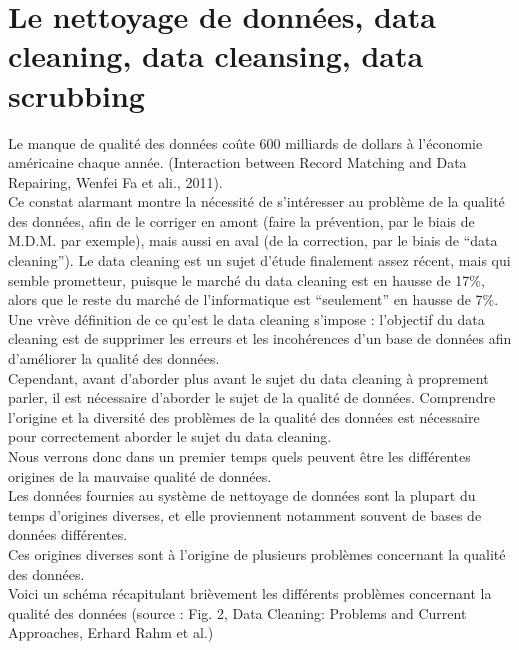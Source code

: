 \section{Le nettoyage de données, data cleaning, data cleansing, data scrubbing}

Le manque de qualité des données coûte 600 milliards de dollars à l’économie américaine chaque année. (Interaction between Record Matching and Data Repairing, Wenfei Fa et ali., 2011).\\
Ce constat alarmant montre la nécessité de s’intéresser au problème de la qualité des données, afin de le corriger en amont (faire la prévention, par le biais de M.D.M. par exemple), mais aussi en aval (de la correction, par le biais de “data cleaning”).
Le data cleaning est un sujet d’étude finalement assez récent, mais qui semble prometteur, puisque le marché du data cleaning est en hausse de 17\%, alors que le reste du marché de l’informatique est “seulement” en hausse de 7\%.\\
Une vrève définition de ce qu’est le data cleaning s’impose : l’objectif du data cleaning est de supprimer les erreurs et les incohérences d’un base de données afin d’améliorer la qualité des données.\\
Cependant, avant d’aborder plus avant le sujet du data cleaning à proprement parler, il est nécessaire d’aborder le sujet de la qualité de données. Comprendre l’origine et la diversité des problèmes de la qualité des données est nécessaire pour correctement aborder le sujet du data cleaning.\\
Nous verrons donc dans un premier temps quels peuvent être les différentes origines de la mauvaise qualité de données.\\
Les données fournies au système de nettoyage de données sont la plupart du temps d’origines diverses, et elle proviennent notamment souvent de bases de données différentes.\\
Ces origines diverses sont à l’origine de plusieurs problèmes concernant la qualité des données.\\
Voici un schéma récapitulant brièvement les différents problèmes concernant la qualité des données (source : Fig. 2, Data Cleaning: Problems and Current Approaches, Erhard Rahm et al.)

